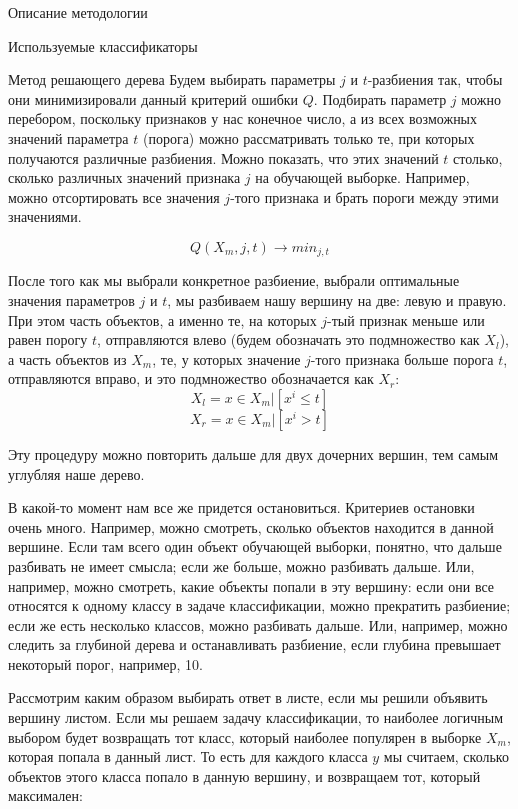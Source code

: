 \begin{section}{Описание методологии}
\begin{subsection}{Используемые классификаторы}
\begin{subsubsection}{Метод решающего дерева}
   Будем выбирать параметры $j$ и $t$-разбиения так, чтобы они минимизировали данный критерий ошибки $Q$. Подбирать параметр $j$ можно перебором, поскольку признаков у нас конечное число, а из всех возможных значений параметра $t$ (порога) можно рассматривать только те, при которых получаются различные разбиения. Можно показать, что этих значений $t$ столько, сколько различных значений признака $j$ на обучающей выборке. Например, можно отсортировать все значения $j$-того признака и брать пороги между этими значениями.

      \begin{equation}
	Q(X_m,j,t) \rightarrow min_{j,t}
  \end{equation}

   После того как мы выбрали конкретное разбиение, выбрали оптимальные значения параметров $j$ и $t$, мы разбиваем нашу вершину на две: левую и правую. При этом часть объектов, а именно те, на которых $j$-тый признак меньше или равен порогу $t$, отправляются влево (будем обозначать это подмножество как $X_l$), а часть объектов из $X_m$, те, у которых значение $j$-того признака больше порога $t$, отправляются вправо, и это подмножество обозначается как $X_r$:
         \begin{equation}
		X_l = {x \in X_m | [x^i \leq t ]}
  \end{equation}
           \begin{equation}
		X_r = {x \in X_m | [x^i > t ]}
  \end{equation}

   Эту процедуру можно повторить дальше для двух дочерних вершин, тем самым углубляя наше дерево.

   В какой-то момент нам все же придется остановиться. Критериев остановки очень много. Например, можно смотреть, сколько объектов находится в данной вершине. Если там всего один объект обучающей выборки, понятно, что дальше разбивать не имеет смысла; если же больше, можно разбивать дальше. Или, например, можно смотреть, какие объекты попали в эту вершину: если они все относятся к одному классу в задаче классификации, можно прекратить разбиение; если же есть несколько классов, можно разбивать дальше. Или, например, можно следить за глубиной дерева и останавливать разбиение, если глубина превышает некоторый порог, например, 10.

	Рассмотрим каким образом выбирать ответ в листе, если мы решили объявить вершину листом.  Если мы решаем задачу классификации, то наиболее логичным выбором будет возвращать тот класс, который наиболее популярен в выборке $X_m$, которая попала в данный лист. То есть для каждого класса $y$ мы считаем, сколько объектов этого класса попало в данную вершину, и возвращаем тот, который максимален:


\end{subsubsection}
\end{subsection}
\end{section}
